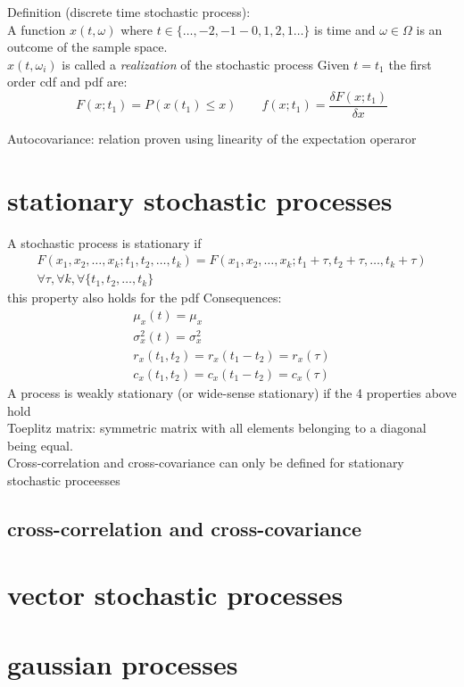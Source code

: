 \documentclass{book}
\begin{document}
Definition (discrete time stochastic process):\\
A function $x(t,\omega)$ where $t \in \{\dots, -2,-1-0,1,2,1\dots\}$ is time and $\omega \in \Omega$ is an outcome of the sample space.\\
$x(t,\omega_i)$ is called a \emph{realization} of the stochastic process
Given $t=t_1$ the first order cdf and pdf are:
\[F(x;t_1)=P(x(t_1)\leq x) \qquad f(x;t_1)=\frac{\delta F(x;t_1)}{\delta x}\]

Autocovariance: 
relation proven using linearity of the expectation operaror

\section{stationary stochastic processes}
A stochastic process is stationary if 
\begin{gather}
    F(x_1,x_2,\dots, x_k;t_1,t_2,\dots,t_k)=F(x_1,x_2,\dots, x_k;t_1+\tau,t_2+ \tau,\dots,t_k+ \tau)\\
    \forall \tau, \forall k, \forall \{t_1,t_2,\dots,t_k\}
\end{gather}
this property also holds for the pdf
Consequences:
\begin{gather}
    \mu_x(t)=\mu_x\\
    \sigma_x^2(t)=\sigma_x^2\\
    r_x(t_1,t_2)=r_x(t_1-t_2)=r_x(\tau)\\
    c_x(t_1,t_2)=c_x(t_1-t_2)=c_x(\tau)
\end{gather}
A process is weakly stationary (or wide-sense stationary) if the 4 properties above hold
\\Toeplitz matrix: symmetric matrix with all elements belonging to a diagonal being equal. \\
Cross-correlation and cross-covariance can only be defined for stationary stochastic proceesses

\subsection{cross-correlation and cross-covariance}

\section{vector stochastic processes}

\section{gaussian processes}
\end{document}
